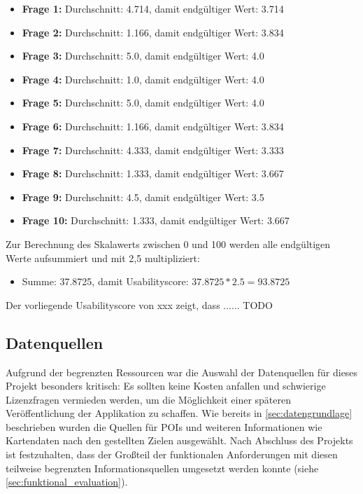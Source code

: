 		\begin{itemize}
			\item \textbf{Frage 1:} Durchschnitt: 4.714, damit endgültiger Wert: 3.714
			\item \textbf{Frage 2:} Durchschnitt: 1.166, damit endgültiger Wert: 3.834
			\item \textbf{Frage 3:} Durchschnitt: 5.0, damit endgültiger Wert: 4.0
			\item \textbf{Frage 4:} Durchschnitt: 1.0, damit endgültiger Wert: 4.0
			\item \textbf{Frage 5:} Durchschnitt: 5.0, damit endgültiger Wert: 4.0
			\item \textbf{Frage 6:} Durchschnitt: 1.166, damit endgültiger Wert: 3.834
			\item \textbf{Frage 7:} Durchschnitt: 4.333, damit endgültiger Wert: 3.333
			\item \textbf{Frage 8:} Durchschnitt: 1.333, damit endgültiger Wert: 3.667
			\item \textbf{Frage 9:} Durchschnitt: 4.5, damit endgültiger Wert: 3.5
			\item \textbf{Frage 10:} Durchschnitt: 1.333, damit endgültiger Wert: 3.667
		\end{itemize}
	
	Zur Berechnung des Skalawerts zwischen 0 und 100 werden alle endgültigen Werte aufsummiert und mit 2,5 multipliziert:
	
	\begin{itemize}
		\item Summe: 37.8725, damit Usabilityscore: $37.8725*2.5=93.8725$
	\end{itemize}

	Der vorliegende Usabilityscore von xxx zeigt, dass ...... TODO
	
	\subsection{Datenquellen}
	Aufgrund der begrenzten Ressourcen war die Auswahl der Datenquellen für dieses Projekt besonders kritisch: Es sollten keine Kosten anfallen und schwierige Lizenzfragen vermieden werden, um die Möglichkeit einer späteren Veröffentlichung der Applikation zu schaffen. Wie bereits in \autoref{sec:datengrundlage} beschrieben wurden die Quellen für \acs{POI}s und weiteren Informationen wie Kartendaten nach den gestellten Zielen ausgewählt. Nach Abschluss des Projekts ist festzuhalten, dass der Großteil der funktionalen Anforderungen mit diesen teilweise begrenzten Informationsquellen umgesetzt werden konnte (siehe \autoref{sec:funktional_evaluation}).